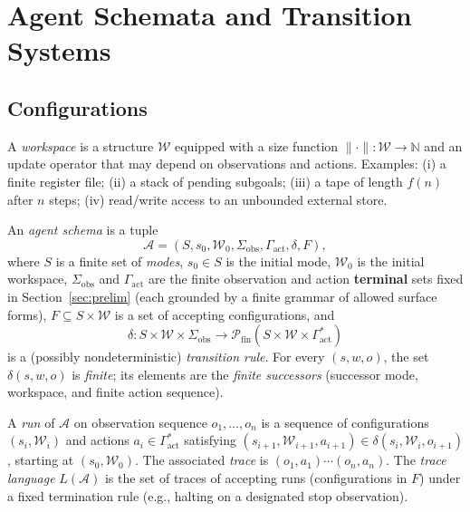\section{Agent Schemata and Transition Systems}
\label{sec:schemata}

\subsection{Configurations}

\begin{definition}[Workspace]
A \emph{workspace} is a structure $\mathcal{W}$ equipped with a size function $\lVert \cdot \rVert : \mathcal{W} \to \mathbb{N}$ and an update operator that may depend on observations and actions. Examples: (i) a finite register file; (ii) a stack of pending subgoals; (iii) a tape of length $f(n)$ after $n$ steps; (iv) read/write access to an unbounded external store.
\end{definition}

\begin{definition}
\label{def:schema}
An \emph{agent schema} is a tuple
\[
\mathcal{A} = (S, s_0, \mathcal{W}_0, \Sigma_{\mathrm{obs}}, \Gamma_{\mathrm{act}}, \delta, F),
\]
where $S$ is a finite set of \emph{modes}, $s_0 \in S$ is the initial mode, $\mathcal{W}_0$ is the initial workspace, $\Sigma_{\mathrm{obs}}$ and $\Gamma_{\mathrm{act}}$ are the finite observation and action \textbf{terminal} sets fixed in Section~\ref{sec:prelim} (each grounded by a finite grammar of allowed surface forms), $F \subseteq S \times \mathcal{W}$ is a set of accepting configurations, and
\[
\delta : S \times \mathcal{W} \times \Sigma_{\mathrm{obs}} \to \mathcal{P}_{\mathrm{fin}}(S \times \mathcal{W} \times \Gamma_{\mathrm{act}}^\ast)
\]
is a (possibly nondeterministic) \emph{transition rule}. For every $(s,w,o)$, the set $\delta(s,w,o)$ is \emph{finite}; its elements are the \emph{finite successors} (successor mode, workspace, and finite action sequence).
\end{definition}

\begin{definition}
A \emph{run} of $\mathcal{A}$ on observation sequence $o_1,\ldots,o_n$ is a sequence of configurations $(s_i,\mathcal{W}_i)$ and actions $a_i \in \Gamma_{\mathrm{act}}^\ast$ satisfying $(s_{i+1},\mathcal{W}_{i+1},a_{i+1}) \in \delta(s_i,\mathcal{W}_i,o_{i+1})$, starting at $(s_0,\mathcal{W}_0)$. The associated \emph{trace} is $(o_1,a_1)\cdots(o_n,a_n)$. The \emph{trace language} $L(\mathcal{A})$ is the set of traces of accepting runs (configurations in $F$) under a fixed termination rule (e.g., halting on a designated stop observation).
\end{definition}

